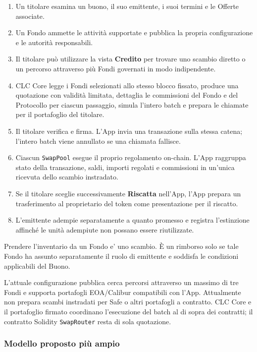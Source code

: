 \documentclass[11pt]{article}
\begin{document}
\begin{enumerate}[leftmargin=*]
\item Un titolare esamina un buono, il suo emittente, i suoi termini e le Offerte associate.
\item Un Fondo ammette le attività supportate e pubblica la propria configurazione e le autorità responsabili.
\item Il titolare può utilizzare la vista \textbf{Credito} per trovare uno scambio diretto o un percorso attraverso più Fondi governati in modo indipendente.
\item CLC Core legge i Fondi selezionati allo stesso blocco fissato, produce una quotazione con validità limitata, dettaglia le commissioni del Fondo e del Protocollo per ciascun passaggio, simula l'intero batch e prepara le chiamate per il portafoglio del titolare.
\item Il titolare verifica e firma. L'App invia una transazione sulla stessa catena; l'intero batch viene annullato se una chiamata fallisce.
\item Ciascun \texttt{SwapPool} esegue il proprio regolamento on-chain. L'App raggruppa stato della transazione, saldi, importi regolati e commissioni in un'unica ricevuta dello scambio instradato.
\item Se il titolare sceglie successivamente \textbf{Riscatta} nell'App, l'App prepara un trasferimento al proprietario del token come presentazione per il riscatto.
\item L'emittente adempie separatamente a quanto promesso e registra l'estinzione affinché le unità adempiute non possano essere riutilizzate.
\end{enumerate}
Prendere l'inventario da un Fondo e' uno scambio. È un rimborso solo se tale Fondo ha assunto separatamente il ruolo di emittente e soddisfa le condizioni applicabili del Buono.

L'attuale configurazione pubblica cerca percorsi attraverso un massimo di tre Fondi e supporta portafogli EOA/Calibur compatibili con l'App. Attualmente non prepara scambi instradati per Safe o altri portafogli a contratto. CLC Core e il portafoglio firmato coordinano l'esecuzione del batch al di sopra dei contratti; il contratto Solidity \texttt{SwapRouter} resta di sola quotazione.

\subsubsection*{Modello proposto più ampio}
\end{document}
